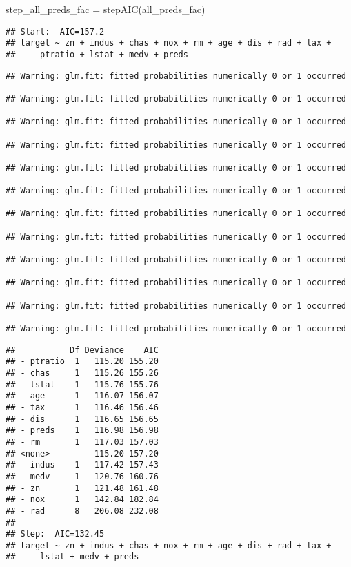 \documentclass[
]{article}
\newenvironment{Shaded}{\begin{snugshade}}{\end{snugshade}}
\newcommand{\FunctionTok}[1]{\textcolor[rgb]{0.00,0.00,0.00}{#1}}
\newcommand{\NormalTok}[1]{#1}
\newcommand{\OtherTok}[1]{\textcolor[rgb]{0.56,0.35,0.01}{#1}}
\begin{document}
\begin{Shaded}
\begin{Highlighting}[]
\NormalTok{step\_all\_preds\_fac }\OtherTok{=} \FunctionTok{stepAIC}\NormalTok{(all\_preds\_fac)}
\end{Highlighting}
\end{Shaded}

\begin{verbatim}
## Start:  AIC=157.2
## target ~ zn + indus + chas + nox + rm + age + dis + rad + tax + 
##     ptratio + lstat + medv + preds
\end{verbatim}

\begin{verbatim}
## Warning: glm.fit: fitted probabilities numerically 0 or 1 occurred

## Warning: glm.fit: fitted probabilities numerically 0 or 1 occurred

## Warning: glm.fit: fitted probabilities numerically 0 or 1 occurred

## Warning: glm.fit: fitted probabilities numerically 0 or 1 occurred

## Warning: glm.fit: fitted probabilities numerically 0 or 1 occurred

## Warning: glm.fit: fitted probabilities numerically 0 or 1 occurred

## Warning: glm.fit: fitted probabilities numerically 0 or 1 occurred

## Warning: glm.fit: fitted probabilities numerically 0 or 1 occurred

## Warning: glm.fit: fitted probabilities numerically 0 or 1 occurred

## Warning: glm.fit: fitted probabilities numerically 0 or 1 occurred

## Warning: glm.fit: fitted probabilities numerically 0 or 1 occurred

## Warning: glm.fit: fitted probabilities numerically 0 or 1 occurred
\end{verbatim}

\begin{verbatim}
##           Df Deviance    AIC
## - ptratio  1   115.20 155.20
## - chas     1   115.26 155.26
## - lstat    1   115.76 155.76
## - age      1   116.07 156.07
## - tax      1   116.46 156.46
## - dis      1   116.65 156.65
## - preds    1   116.98 156.98
## - rm       1   117.03 157.03
## <none>         115.20 157.20
## - indus    1   117.42 157.43
## - medv     1   120.76 160.76
## - zn       1   121.48 161.48
## - nox      1   142.84 182.84
## - rad      8   206.08 232.08
## 
## Step:  AIC=132.45
## target ~ zn + indus + chas + nox + rm + age + dis + rad + tax + 
##     lstat + medv + preds
\end{verbatim}
\end{document}
